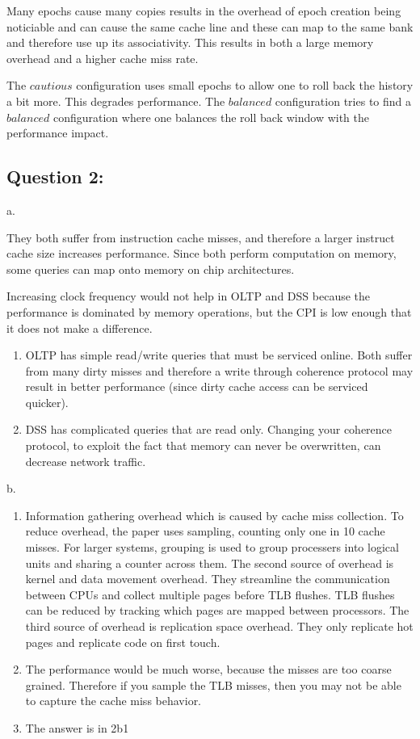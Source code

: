 Many epochs cause many copies results in the overhead of epoch creation
being noticiable and can cause the same cache line and these can map to
the same bank and therefore use up its associativity. This results in
both a large memory overhead and a higher cache miss rate.

The $cautious$ configuration uses small epochs to allow one to roll back
the history a bit more. This degrades performance. The $balanced$
configuration tries to find a $balanced$ configuration where one
balances the roll back window with the performance impact.

\subsection{Question 2:}

a.

They both suffer from instruction cache misses, and therefore a larger
instruct cache size increases performance. Since both perform
computation on memory, some queries can map onto memory on chip
architectures.

Increasing clock frequency would not help in OLTP and DSS because the
performance is dominated by memory operations, but the CPI is low enough
that it does not make a difference.

\begin{enumerate}
\def\labelenumi{\arabic{enumi}.}
\item
  OLTP has simple read/write queries that must be serviced online. Both
  suffer from many dirty misses and therefore a write through coherence
  protocol may result in better performance (since dirty cache access
  can be serviced quicker).
\item
  DSS has complicated queries that are read only. Changing your
  coherence protocol, to exploit the fact that memory can never be
  overwritten, can decrease network traffic.
\end{enumerate}

b.

\begin{enumerate}
\def\labelenumi{\arabic{enumi}.}
\item
  Information gathering overhead which is caused by cache miss
  collection. To reduce overhead, the paper uses sampling, counting only
  one in 10 cache misses. For larger systems, grouping is used to group
  processers into logical units and sharing a counter across them. The
  second source of overhead is kernel and data movement overhead. They
  streamline the communication between CPUs and collect multiple pages
  before TLB flushes. TLB flushes can be reduced by tracking which pages
  are mapped between processors. The third source of overhead is
  replication space overhead. They only replicate hot pages and
  replicate code on first touch.
\item
  The performance would be much worse, because the misses are too coarse
  grained. Therefore if you sample the TLB misses, then you may not be
  able to capture the cache miss behavior.
\item
  The answer is in 2b1
\end{enumerate}

